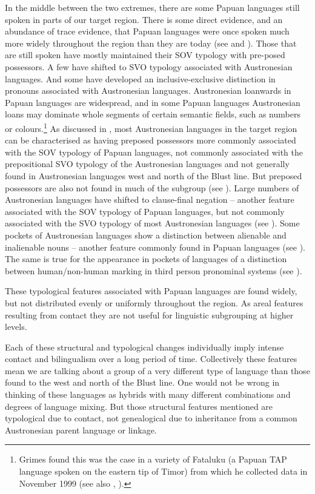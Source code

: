 In the middle between the two extremes,
there are some Papuan languages still spoken in parts of our target region.
There is some direct evidence,
and an abundance of trace evidence,
that Papuan languages were once spoken much more widely throughout
the region than they are today (see  and ).
Those that are still spoken have mostly maintained their SOV
typology with pre-posed possessors.
A few have shifted to SVO typology associated with Austronesian languages.
And some have developed an inclusive-exclusive distinction in
 pronouns associated with Austronesian languages.
Austronesian loanwards in Papuan languages are widespread,
and in some Papuan languages Austronesian loans may dominate
whole segments of certain semantic fields,
such as numbers or colours.\footnote{
		Grimes found this was the
		case in a variety of Fataluku (a Papuan TAP language spoken on
		the eastern tip of Timor) from which he collected data in November
		1999 (see also \cite[26]{Heston2015}, \cite{UsherSchapper2018,UsherSchapper2022}).} 
As discussed in ,
most Austronesian languages in the target region can be characterised
as having preposed possessors more commonly associated with the
SOV typology of Papuan languages,
not commonly associated with the prepositional SVO typology of
the Austronesian languages and not generally found in Austronesian languages west
and north of the Blust line.
But preposed possessors are also not found in much of the  subgroup (see ).
Large numbers of Austronesian languages have shifted to clause-final
negation -- another feature associated with the SOV typology of
Papuan languages, but not commonly associated with the SVO typology of most Austronesian languages (see ).
Some pockets of Austronesian languages show a distinction between
alienable and inalienable nouns -- another feature commonly found in Papuan languages (see ).
The same is true for the appearance in pockets of languages of
a distinction between human/non-human marking in third person
pronominal systems (see ).

These typological features associated with Papuan languages are
found widely, but not distributed evenly or uniformly throughout the region.
As areal features resulting from contact they are not useful
for linguistic subgrouping at higher levels.

Each of these structural
and typological changes individually imply intense contact
and bilingualism over a long period of time.
Collectively these features mean we are talking about a group
of a very different type of language than those found to the
west and north of the Blust line.
One would not be wrong in thinking of these languages as hybrids
with many different combinations
and degrees of language mixing.
But those structural features mentioned are typological due to
contact, not genealogical due to inheritance from a common Austronesian
parent language or linkage.

